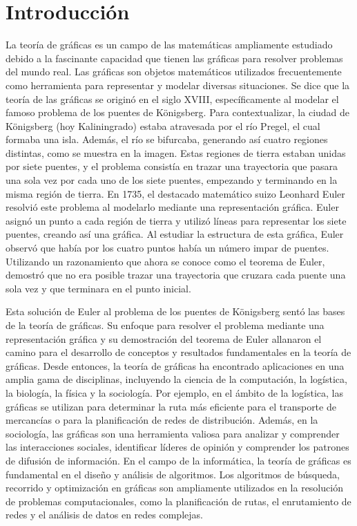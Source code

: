 \chapter{Introducci\'on}
La teoría de gráficas es un campo de las matemáticas ampliamente estudiado
debido a la fascinante capacidad que tienen las gráficas para resolver problemas
del mundo real. Las gráficas son objetos matemáticos utilizados frecuentemente
como herramienta para representar y modelar diversas situaciones. Se dice que la
teoría de las gráficas se originó en el siglo XVIII, específicamente al modelar
el famoso problema de los puentes de Königsberg. Para contextualizar, la ciudad
de Königsberg (hoy Kaliningrado) estaba atravesada por el río Pregel, el cual
formaba una isla. Además, el río se bifurcaba, generando así cuatro regiones
distintas, como se muestra en la imagen. Estas regiones de tierra estaban unidas
por siete puentes, y el problema consistía en trazar una trayectoria que pasara
una sola vez por cada uno de los siete puentes, empezando y terminando en la
misma región de tierra. En 1735, el destacado matemático suizo Leonhard Euler
resolvió este problema al modelarlo mediante una representación gráfica. Euler
asignó un punto a cada región de tierra y utilizó líneas para representar los
siete puentes, creando así una gráfica. Al estudiar la estructura de esta
gráfica, Euler observó que había por los cuatro puntos había un número impar de
puentes. Utilizando un razonamiento que ahora se conoce como el teorema de
Euler, demostró que no era posible trazar una trayectoria que cruzara cada
puente una sola vez y que terminara en el punto inicial.

Esta solución de Euler al problema de los puentes de Königsberg sentó las bases
de la teoría de gráficas. Su enfoque para resolver el problema mediante una
representación gráfica y su demostración del teorema de Euler allanaron el
camino para el desarrollo de conceptos y resultados fundamentales en la teoría
de gráficas. Desde entonces, la teoría de gráficas ha encontrado aplicaciones en
una amplia gama de disciplinas, incluyendo la ciencia de la computación, la
logística, la biología, la física y la sociología. Por ejemplo, en el ámbito de
la logística, las gráficas se utilizan para determinar la ruta más eficiente
para el transporte de mercancías o para la planificación de redes de
distribución. Además, en la sociología, las gráficas son una herramienta valiosa
para analizar y comprender las interacciones sociales, identificar líderes de
opinión y comprender los patrones de difusión de información. En el campo de la
informática, la teoría de gráficas es fundamental en el diseño y análisis de
algoritmos. Los algoritmos de búsqueda, recorrido y optimización en gráficas son
ampliamente utilizados en la resolución de problemas computacionales, como la
planificación de rutas, el enrutamiento de redes y el análisis de datos en redes
complejas.

